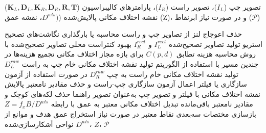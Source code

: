 \begin{algorithm}[ht]
	\caption{تولید نقشه اختلاف مکانی و نقشه عمق از تصاویر استریو}
	\label{alg:stereo_depth_pipeline}
	\begin{algorithmic}[1]
		\REQUIRE تصویر چپ ($I_L$)، تصویر راست ($I_R$)، پارامترهای کالیبراسیون ($\mathbf{K}_L,\mathbf{D}_L,\mathbf{K}_R,\mathbf{D}_R,\mathbf{R},\mathbf{T}$)
		\ENSURE نقشه اختلاف مکانی پالایش‌شده ($D^{wls})$، نقشه عمق (Z)، و در صورت نیاز ابرنقاط ($\mathcal{P}$)
		
		
		\STATE حذف اعوجاج لنز از تصاویر چپ و راست
		\STATE محاسبه یا بارگذاری نگاشت‌های تصحیح استریو
		\STATE تولید تصاویر تصحیح‌شده \(I_L^{rect}\) و \(I_R^{rect}\)
		\STATE بهبود کنتراست محلی تصاویر تصحیح‌شده با روش 
		\STATE محاسبه هزینه تطابق \(C(p,d)\) برای بازه مجاز اختلاف مکانی
		\STATE تجمیع هزینه‌ها در چندین مسیر با استفاده از الگوریتم 
		\STATE تولید نقشه اختلاف مکانی خام چپ به راست \(D_L^{raw}\)
		\STATE تولید نقشه اختلاف مکانی خام راست به چپ \(D_R^{raw}\) در صورت استفاده از آزمون سازگاری یا فیلتر 
		\STATE اعمال آزمون سازگاری چپ-راست و حذف مقادیر نامعتبر
		\STATE پالایش نقشه اختلاف مکانی با فیلتر  و تصویر چپ به‌عنوان تصویر راهنما
		\STATE حذف لکه‌های کوچک و مقادیر نامعتبر باقی‌مانده
		\STATE تبدیل اختلاف مکانی معتبر به عمق با رابطه \(Z=f_xB/D^{wls}\)
		\STATE بازسازی مختصات سه‌بعدی نقاط معتبر در صورت نیاز
		\STATE استخراج عمق هدف و موانع از نواحی آشکارسازی‌شده
		\RETURN \(D^{wls}\)، \(Z\)، \(\mathcal{P}\)
	\end{algorithmic}
	
\end{algorithm}
